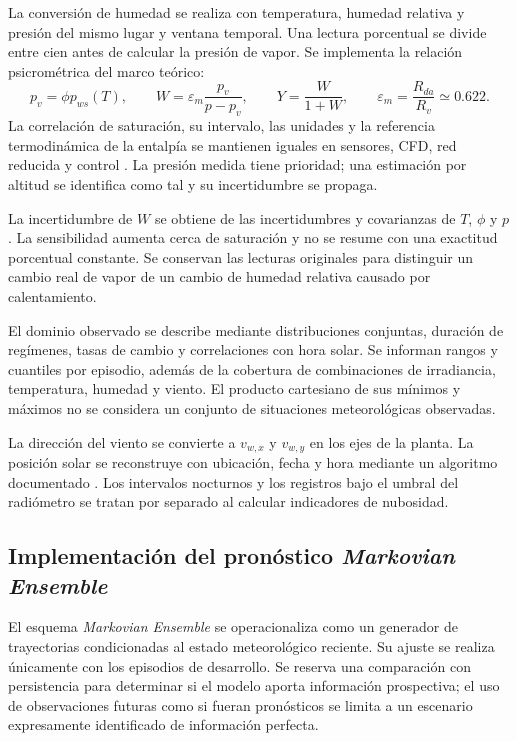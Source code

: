 La conversión de humedad se realiza con temperatura, humedad relativa y presión del mismo lugar y ventana temporal. Una lectura porcentual se divide entre cien antes de calcular la presión de vapor. Se implementa la relación psicrométrica del marco teórico:
\begin{equation}
p_v=\phi p_{ws}(T),\qquad
W=\varepsilon_m\frac{p_v}{p-p_v},\qquad
Y=\frac{W}{1+W},\qquad
\varepsilon_m=\frac{R_{da}}{R_v}\simeq0.622.
\label{met:conversion_humedad}
\end{equation}
La correlación de saturación, su intervalo, las unidades y la referencia termodinámica de la entalpía se mantienen iguales en sensores, CFD, red reducida y control \cite{ashrae2021}. La presión medida tiene prioridad; una estimación por altitud se identifica como tal y su incertidumbre se propaga.

La incertidumbre de $W$ se obtiene de las incertidumbres y covarianzas de $T$, $\phi$ y $p$. La sensibilidad aumenta cerca de saturación y no se resume con una exactitud porcentual constante. Se conservan las lecturas originales para distinguir un cambio real de vapor de un cambio de humedad relativa causado por calentamiento.

El dominio observado se describe mediante distribuciones conjuntas, duración de regímenes, tasas de cambio y correlaciones con hora solar. Se informan rangos y cuantiles por episodio, además de la cobertura de combinaciones de irradiancia, temperatura, humedad y viento. El producto cartesiano de sus mínimos y máximos no se considera un conjunto de situaciones meteorológicas observadas.

La dirección del viento se convierte a $v_{w,x}$ y $v_{w,y}$ en los ejes de la planta. La posición solar se reconstruye con ubicación, fecha y hora mediante un algoritmo documentado \cite{reda2004}. Los intervalos nocturnos y los registros bajo el umbral del radiómetro se tratan por separado al calcular indicadores de nubosidad.

\subsection{Implementación del pronóstico \textit{Markovian Ensemble}}
\label{met:markov}

El esquema \textit{Markovian Ensemble} se operacionaliza como un generador de trayectorias condicionadas al estado meteorológico reciente. Su ajuste se realiza únicamente con los episodios de desarrollo. Se reserva una comparación con persistencia para determinar si el modelo aporta información prospectiva; el uso de observaciones futuras como si fueran pronósticos se limita a un escenario expresamente identificado de información perfecta.

